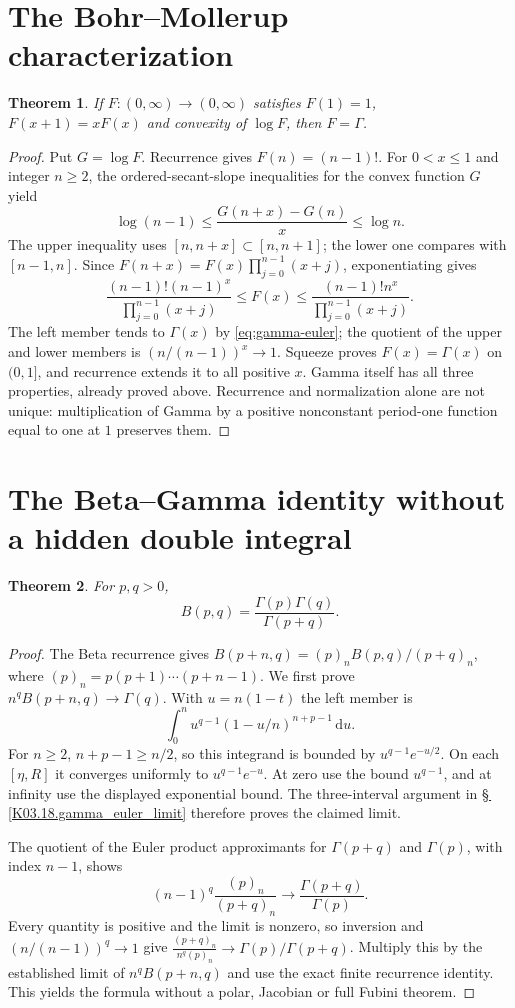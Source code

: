 \documentclass[11pt,oneside,a4paper]{book}
\newtheorem{theorem}{Theorem}[chapter]
\theoremstyle{definition}
\theoremstyle{remark}
\newcommand{\dd}{\,\mathrm d}
\newcommand{\KEntry}[2]{\Needspace{7\baselineskip}\section{#2}\label{#1}{\small\sffamily\color{black!60}\detokenize{#1}}\par}
\newcommand{\KRef}[1]{\hyperref[#1]{\S\,\ref*{#1}}}
\begin{document}
\KEntry{K03.18.bohr_mollerup}{The Bohr--Mollerup characterization}
\begin{theorem}
If $F:(0,\infty)\to(0,\infty)$ satisfies $F(1)=1$,
$F(x+1)=xF(x)$ and convexity of $\log F$, then $F=\Gamma$.
\end{theorem}
\begin{proof}
Put $G=\log F$. Recurrence gives $F(n)=(n-1)!$.
For $0<x\leq1$ and integer $n\geq2$, the ordered-secant-slope inequalities
for the convex function $G$ yield
\[
 \log(n-1)\leq\frac{G(n+x)-G(n)}x\leq\log n.
\]
The upper inequality uses $[n,n+x]\subset[n,n+1]$; the lower one compares
with $[n-1,n]$. Since
$F(n+x)=F(x)\prod_{j=0}^{n-1}(x+j)$, exponentiating gives
\[
 \frac{(n-1)!(n-1)^x}{\prod_{j=0}^{n-1}(x+j)}
 \leq F(x)\leq
 \frac{(n-1)!n^x}{\prod_{j=0}^{n-1}(x+j)}.
\]
The left member tends to $\Gamma(x)$ by \eqref{eq:gamma-euler}; the quotient
of the upper and lower members is $(n/(n-1))^x\to1$. Squeeze proves
$F(x)=\Gamma(x)$ on $(0,1]$, and recurrence extends it to all positive $x$.
Gamma itself has all three properties, already proved above. Recurrence and
normalization alone are not unique: multiplication of Gamma by a positive
nonconstant period-one function equal to one at $1$ preserves them.
\end{proof}

\KEntry{K03.18.beta_gamma}{The Beta--Gamma identity without a hidden double integral}
\begin{theorem}
For $p,q>0$,
\[
 B(p,q)=\frac{\Gamma(p)\Gamma(q)}{\Gamma(p+q)}.
\]
\end{theorem}
\begin{proof}
The Beta recurrence gives
$B(p+n,q)=(p)_n B(p,q)/(p+q)_n$, where
$(p)_n=p(p+1)\cdots(p+n-1)$.
We first prove $n^qB(p+n,q)\to\Gamma(q)$.
With $u=n(1-t)$ the left member is
\[
 \int_0^n u^{q-1}(1-u/n)^{n+p-1}\dd u.
\]
For $n\geq2$, $n+p-1\geq n/2$, so this integrand is bounded by
$u^{q-1}e^{-u/2}$. On each $[\eta,R]$ it converges uniformly to
$u^{q-1}e^{-u}$. At zero use the bound $u^{q-1}$, and at infinity use
the displayed exponential bound. The three-interval argument in
\KRef{K03.18.gamma_euler_limit} therefore proves the claimed limit.

The quotient of the Euler product approximants for $\Gamma(p+q)$ and
$\Gamma(p)$, with index $n-1$, shows
\[
 (n-1)^q\frac{(p)_n}{(p+q)_n}\longrightarrow
 \frac{\Gamma(p+q)}{\Gamma(p)}.
\]
Every quantity is positive and the limit is nonzero, so inversion and
$(n/(n-1))^q\to1$ give
$\frac{(p+q)_n}{n^q(p)_n}\to\Gamma(p)/\Gamma(p+q)$.
Multiply this by the established limit of $n^qB(p+n,q)$ and use the exact
finite recurrence identity. This yields the formula without a polar,
Jacobian or full Fubini theorem.
\end{proof}
\end{document}
